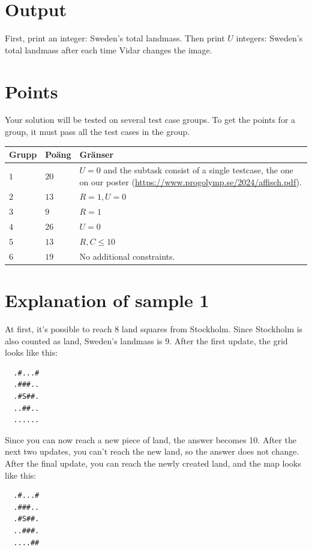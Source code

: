 \section*{Output}
First, print an integer: Sweden's total landmass.
Then print $U$ integers: Sweden's total landmass after each time Vidar changes the image.

\section*{Points}
Your solution will be tested on several test case groups.
To get the points for a group, it must pass all the test cases in the group.

\noindent
\begin{tabular}{| l | l | p{12cm} |}
  \hline
  \textbf{Grupp} & \textbf{Poäng} & \textbf{Gränser} \\ \hline
  $1$    & $20$       & $U=0$ and the subtask consist of a single testcase, the one on our poster (\url{https://www.progolymp.se/2024/affisch.pdf}). \\ \hline
  $2$    & $13$       & $R=1, U=0$ \\ \hline
  $3$    & $9$        & $R=1$ \\ \hline
  $4$    & $26$       & $U=0$ \\ \hline
  $5$    & $13$       & $R,C \le 10$ \\ \hline
  $6$    & $19$       & No additional constraints. \\ \hline
\end{tabular}

\section*{Explanation of sample 1}
At first, it's possible to reach 8 land squares from Stockholm. Since Stockholm is also counted as land, Sweden's landmass is 9. After the first update, the grid looks like this:

\noindent
\begin{verbatim}
  .#...#
  .###..
  .#S##.
  ..##..
  ......
\end{verbatim}

\noindent
Since you can now reach a new piece of land, the answer becomes 10. After the next two updates, you can't reach the new land, so the answer does not change.
After the final update, you can reach the newly created land, and the map looks like this:

\noindent
\begin{verbatim}
  .#...#
  .###..
  .#S##.
  ..###.
  ....##
\end{verbatim}